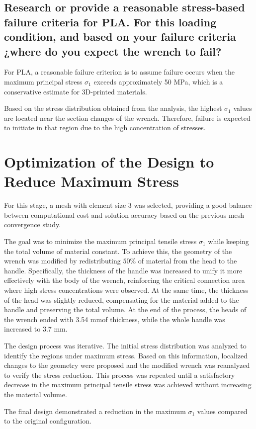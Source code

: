 \documentclass[12pt]{article}
\begin{document}
\subsection{Research or provide a reasonable stress-based failure criteria for PLA. For this loading condition, and based on your failure criteria ¿where do you expect the wrench to fail?}

For PLA, a reasonable failure criterion is to assume failure occurs when the maximum principal stress $\sigma_1$ exceeds approximately 50 MPa, which is a conservative estimate for 3D-printed materials.

Based on the stress distribution obtained from the analysis, the highest $\sigma_1$ values are located near the section changes of the wrench.  
Therefore, failure is expected to initiate in that region due to the high concentration of stresses.


\section{Optimization of the Design to Reduce Maximum Stress}

For this stage, a mesh with element size $3$ was selected, providing a good balance between computational cost and solution accuracy based on the previous mesh convergence study.

The goal was to minimize the maximum principal tensile stress $\sigma_1$ while keeping the total volume of material constant.  
To achieve this, the geometry of the wrench was modified by redistributing $50\%$ of material from the head to the handle.
Specifically, the thickness of the handle was increased to unify it more effectively with the body of the wrench, reinforcing the critical connection area where high stress concentrations were observed.  
At the same time, the thickness of the head was slightly reduced, compensating for the material added to the handle and preserving the total volume. At the end of the process, the heads of the wrench ended with 3.54 mmof thickness, while the whole handle was increased to 3.7 mm.

The design process was iterative. The initial stress distribution was analyzed to identify the regions under maximum stress. Based on this information, localized changes to the geometry were proposed and the modified wrench was reanalyzed to verify the stress reduction.  
This process was repeated until a satisfactory decrease in the maximum principal tensile stress was achieved without increasing the material volume.

The final design demonstrated a reduction in the maximum $\sigma_1$ values compared to the original configuration. 
\end{document}
